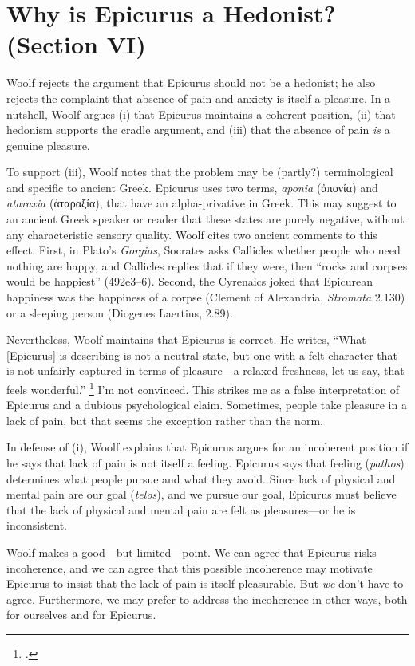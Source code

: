 \documentclass[12pt,letterpaper]{article}
\begin{document}
\section*{Why is Epicurus a Hedonist? (Section VI)}

Woolf rejects the argument that Epicurus should not be a hedonist; he also rejects the complaint that absence of pain and anxiety is itself a pleasure.
In a nutshell, Woolf argues (i) that Epicurus maintains a coherent position, (ii) that hedonism supports the cradle argument, and (iii) that the absence of pain \textit{is} a genuine pleasure.

To support (iii), Woolf notes that the problem may be (partly?) terminological and specific to ancient Greek.
Epicurus uses two terms, \textit{aponia} (\textgreek{ἀπονία}) and \textit{ataraxia} (\textgreek{ἀταραξία}), that have an alpha-privative in Greek.
This may suggest to an ancient Greek speaker or reader that these states are purely negative, without any characteristic sensory quality.
Woolf cites two ancient comments to this effect.
First, in Plato's \textit{Gorgias}, Socrates asks Callicles whether people who need nothing are happy, and Callicles replies that if they were, then ``rocks and corpses would be happiest'' (492e3--6).
Second, the Cyrenaics joked that Epicurean happiness was the happiness of a corpse (Clement of Alexandria, \textit{Stromata} 2.130) or a sleeping person (Diogenes Laertius, 2.89).

Nevertheless, Woolf maintains that Epicurus is correct.
He writes, ``What [Epicurus] is describing is not a neutral state, but one with a felt character that is not unfairly captured in terms of pleasure—a relaxed freshness, let us say, that feels wonderful.''%
\footcite[][174]{pleasure-and-desire-woolf-2009}
I'm not convinced.
This strikes me as a false interpretation of Epicurus and a dubious psychological claim.
Sometimes, people take pleasure in a lack of pain, but that seems the exception rather than the norm.

In defense of (i), Woolf explains that Epicurus argues for an incoherent position if he says that lack of pain is not itself a feeling.
Epicurus says that feeling (\textit{pathos}) determines what people pursue and what they avoid.
Since lack of physical and mental pain are our goal (\textit{telos}), and we pursue our goal, Epicurus must believe that the lack of physical and mental pain are felt as pleasures---or he is inconsistent.

Woolf makes a good---but limited---point.
We can agree that Epicurus risks incoherence, and we can agree that this possible incoherence may motivate Epicurus to insist that the lack of pain is itself pleasurable.
But \textit{we} don't have to agree.
Furthermore, we may prefer to address the incoherence in other ways, both for ourselves and for Epicurus.
\end{document}
